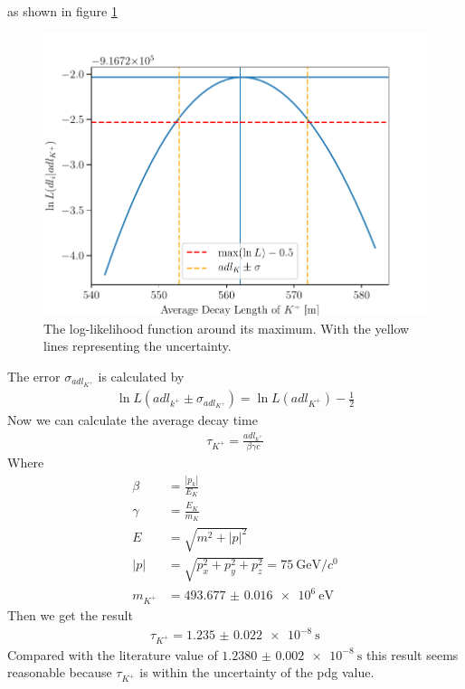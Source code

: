\documentclass[12pt,a4paper,oneside,english]{article}
\begin{document}
as shown in figure \ref{fig:log_likelihood}
\begin{figure}[H]
\centering
\includegraphics[width=0.8\linewidth]{images/log_likelihood_fuction.pdf}
	\caption{The log-likelihood function around its maximum. With the yellow lines representing the uncertainty.}
	\label{fig:log_likelihood}
\end{figure}
The error $\sigma_{adl_{K^+}}$ is calculated by
\begin{align}
\ln L(adl_{k^+}\pm\sigma_{adl_{K^+}}) = \ln L(adl_{K^+}) - \frac{1}{2}
\end{align}
Now we can calculate the average decay time
\begin{align}
\tau_{K^+} = \frac{adl_{k^+}}{\beta\gamma c}
\end{align}
Where
	\begin{align}
		\label{eq: beta}
		\beta &= \frac{|p_k|}{E_K}\\
		\gamma &= \frac{E_K}{m_K}\\
		E &= \sqrt{m^2 + |p|^2}\\
		|p| &= \sqrt{p_x^2 + p_y^2 + p_z^2 } = \SI{75}{\giga\electronvolt\per\clight}\\
		\label{eq: mass_kaon}
		m_{K^+} &= \SI{493.677(16)e6}{\electronvolt}
	\end{align}
Then we get the result
\begin{align}
	\tau_{K^+} = \SI{1.235(22)e-8}{\second}
\end{align}
Compared with the literature value of $\SI{1.2380(20)e-8}{\second}$ this result seems reasonable because $\tau_{K^+}$ is within the uncertainty of the pdg value.
\end{document}
